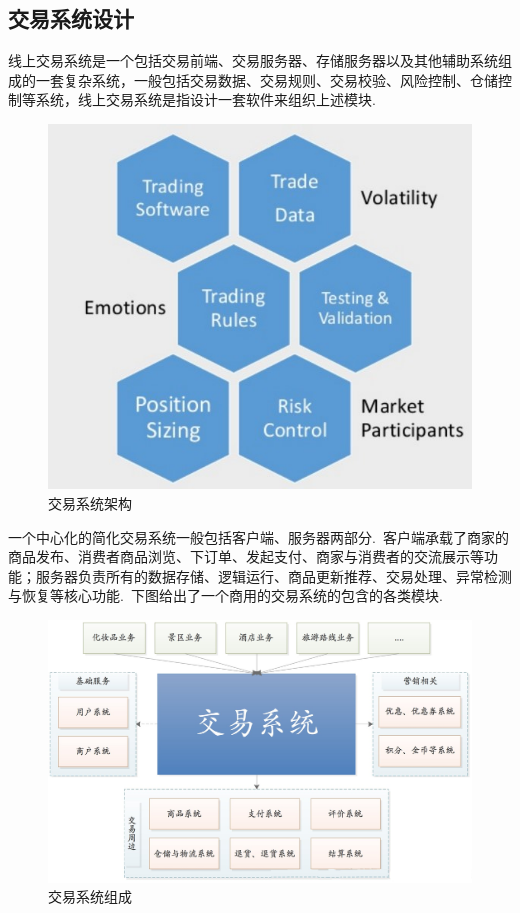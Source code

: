 \documentclass[a4paper,12pt,titlepage]{ctexart}
\begin{document}
\subsection{交易系统设计}
线上交易系统是一个包括交易前端、交易服务器、存储服务器以及其他辅助系统组成的一套复杂系统，一般包括交易数据、交易规则、交易校验、风险控制、仓储控制等系统，线上交易系统是指设计一套软件来组织上述模块.~\par
\begin{figure}[!hbp]
	\centering
	\includegraphics[scale=1.3]{fig11.jpg}
	\caption{交易系统架构}
\end{figure}
一个中心化的简化交易系统一般包括客户端、服务器两部分.~客户端承载了商家的商品发布、消费者商品浏览、下订单、发起支付、商家与消费者的交流展示等功能；服务器负责所有的数据存储、逻辑运行、商品更新推荐、交易处理、异常检测与恢复等核心功能.~下图给出了一个商用的交易系统的包含的各类模块.~\par
\begin{figure}[!hbp]
	\centering
	\includegraphics[scale=0.3]{fig12.jpg}
	\caption{交易系统组成}
\end{figure}
\end{document}
